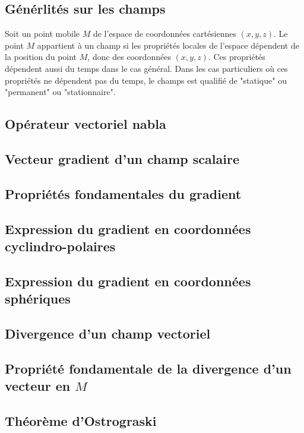 \documentclass[lecture.tex]{subfiles}
\begin{document}
\subsection{Générlités sur les champs}

Soit un point mobile $M$ de l'espace de coordonnées cartésiennes $(x,y,z)$. Le point $M$ appartient à un champ si les propriétés locales de l'espace dépendent de la position du point $M$, donc des coordonnées $(x,y,z)$. Ces propriétés dépendent aussi du temps dans le cas général. Dans les cas particuliers où ces propriétés ne dépendent pas du temps, le champs est qualifié de "statique" ou "permanent" ou "stationnaire".

\subsection{Opérateur vectoriel nabla}

\subsection{Vecteur gradient d'un champ scalaire}

\subsection{Propriétés fondamentales du gradient}

\subsection{Expression du gradient en coordonnées cyclindro-polaires}

\subsection{Expression du gradient en coordonnées sphériques}

\subsection{Divergence d'un champ vectoriel}

\subsection{Propriété fondamentale de la divergence d'un vecteur en $M$}

\subsection{Théorème d'Ostrograski}
\end{document}
